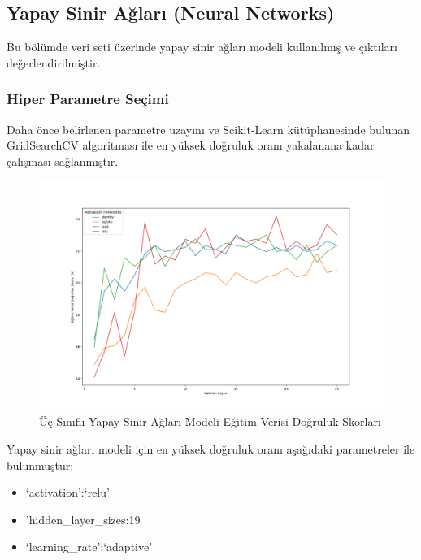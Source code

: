 \documentclass[12pt,twoside]{deuthesis}
\providecommand{\tightlist}{%
  \setlength{\itemsep}{0pt}\setlength{\parskip}{0pt}}
\begin{document}
\hypertarget{mult_nn}{%
\subsection{Yapay Sinir Ağları (Neural Networks)}\label{mult_nn}}

Bu bölümde veri seti üzerinde yapay sinir ağları modeli kullanılmış ve çıktıları değerlendirilmiştir.

\hypertarget{hiper-parametre-seuxe7imi-3}{%
\subsubsection{Hiper Parametre Seçimi}\label{hiper-parametre-seuxe7imi-3}}

Daha önce belirlenen parametre uzayını ve Scikit-Learn kütüphanesinde bulunan GridSearchCV algoritması ile en yüksek doğruluk oranı yakalanana kadar çalışması sağlanmıştır.
\begin{figure}

{\centering \includegraphics[width=1.1\linewidth,height=0.5\textheight]{figure/NN_Grid_Graph} 

}

\caption{Üç Sınıflı Yapay Sinir Ağları Modeli Eğitim Verisi Doğruluk Skorları}\label{fig:unnamed-chunk-45}
\end{figure}
Yapay sinir ağları modeli için en yüksek doğruluk oranı aşağıdaki parametreler ile bulunmuştur;
\begin{itemize}
\tightlist
\item
  `activation':`relu'
\item
  'hidden\_layer\_sizes:19
\item
  `learning\_rate':`adaptive'
\end{itemize}
\newpage
\end{document}
